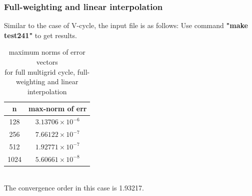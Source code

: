 \documentclass[a4paper,twocolumn]{article}
\theoremstyle{definition}
\begin{document}
\subsubsection{Full-weighting and linear interpolation}
Similar to the case of V-cycle, the input file is as follows:
\newpage
\noindent Use command \textbf{"make test241"} to get results. 
\begin{table}[!htp]
	\centering
	\begin{tabular}{|c|c|}
		\hline	
		n  & max-norm of err \\
		\hline		
		128 & $3.13706\times 10^{-6}$ \\
		\hline		
		256 & $7.66122\times 10^{-7}$ \\
		\hline		
		512 & $1.92771\times 10^{-7}$ \\
		\hline		
		1024 & $5.60661\times 10^{-8}$ \\
		\hline
	\end{tabular}
	\caption{maximum norms of error vectors \\for full multigrid cycle, full-weighting and linear interpolation}
\end{table}\\
The convergence order in this case is 1.93217.
\end{document}
